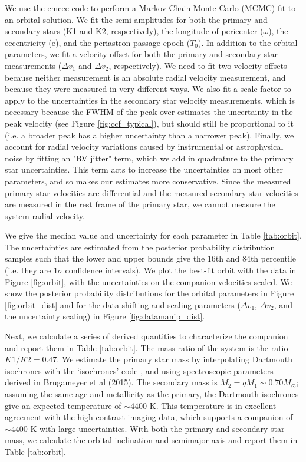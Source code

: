 \documentclass[twocolumn]{emulateapj}
\begin{document}
We use the emcee code \citep{emcee} to perform a Markov Chain Monte Carlo (MCMC) fit to an orbital solution. We fit the semi-amplitudes for both the primary and secondary stars (K1 and K2, respectively), the longitude of pericenter ($\omega$), the eccentricity (e), and the periastron passage epoch ($T_0$). In addition to the orbital parameters, we fit a velocity offset for both the primary and secondary star measurements ($\Delta v_1$ and $\Delta v_2$, respectively). We need to fit two velocity offsets because neither measurement is an absolute radial velocity measurement, and because they were measured in very different ways. We also fit a scale factor to apply to the uncertainties in the secondary star velocity measurements, which is necessary because the FWHM of the peak over-estimates the uncertainty in the peak velocity (see Figure \ref{fig:ccf_typical}), but should still be proportional to it (i.e. a broader peak has a higher uncertainty than a narrower peak). Finally, we account for radial velocity variations caused by instrumental or astrophysical noise by fitting an "RV jitter" term, which we add in quadrature to the primary star uncertainties. This term acts to increase the uncertainties on most other parameters, and so makes our estimates more conservative. Since the measured primary star velocities are differential and the measured secondary star velocities are measured in the rest frame of the primary star, we cannot measure the system radial velocity. 

 We give the median value and uncertainty for each parameter in Table \ref{tab:orbit}. The uncertainties are estimated from the posterior probability distribution samples such that the lower and upper bounds give the 16th and 84th percentile (i.e. they are $1\sigma$ confidence intervals). We plot the best-fit orbit with the data in Figure \ref{fig:orbit}, with the uncertainties on the companion velocities scaled. We show the posterior probability distributions for the orbital parameters in Figure \ref{fig:orbit_dist} and for the data shifting and scaling parameters ($\Delta v_1$, $\Delta v_2$, and the uncertainty scaling) in Figure \ref{fig:datamanip_dist}.

Next, we calculate a series of derived quantities to characterize the companion and report them in Table \ref{tab:orbit}. The mass ratio of the system is the ratio $K1/K2 = 0.47$. We estimate the primary star mass by interpolating Dartmouth isochrones \citep{Dotter2008} with the `isochrones' code \citep[described in][]{Montet2015}, and using spectroscopic parameters derived in Brugameyer et al (2015). The secondary mass is $M_2 = qM_1 \sim 0.70 M_{\odot}$; assuming the same age and metallicity as the primary, the Dartmouth isochrones give an expected temperature of $\sim 4400 $ K. This temperature is in excellent agreement with the high contrast imaging data, which supports a companion of $\sim 4400$ K with large uncertainties. With both the primary and secondary star mass, we calculate the orbital inclination and semimajor axis and report them in Table \ref{tab:orbit}.
\end{document}

